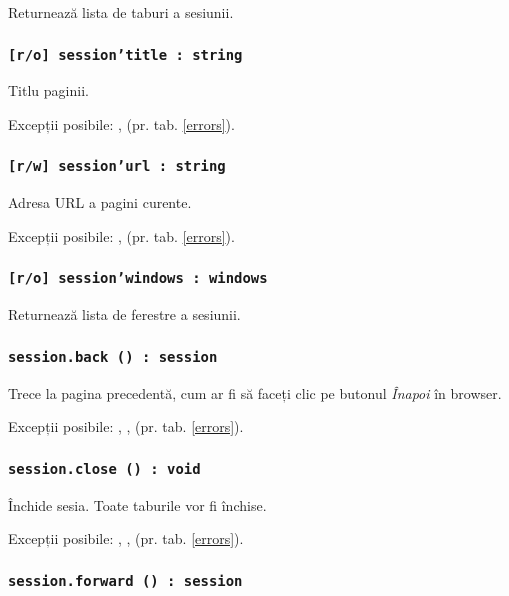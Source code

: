 Returnează lista de taburi a sesiunii.

\subsubsection{\texttt{[r/o] session'title : string}}

Titlu paginii.

Excepții posibile: ,  (pr. tab. \ref{errors}).

\subsubsection{\texttt{[r/w] session'url : string}}

Adresa URL a pagini curente.

Excepții posibile: ,  (pr. tab. \ref{errors}).

\subsubsection{\texttt{[r/o] session'windows : windows}}

Returnează lista de ferestre a sesiunii.

\subsubsection{\texttt{session.back () : session}}

Trece la pagina precedentă, cum ar fi să faceți clic pe butonul \textit{Înapoi} în browser.

Excepții posibile: , ,  (pr. tab. \ref{errors}).

\subsubsection{\texttt{session.close () : void}}

Închide sesia. Toate taburile vor fi închise.

Excepții posibile: , ,  (pr. tab. \ref{errors}).

\subsubsection{\texttt{session.forward () : session}}


